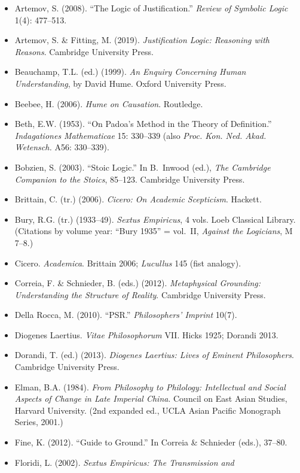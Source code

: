 \documentclass[11pt]{article}
\theoremstyle{plain}
\theoremstyle{definition}
\theoremstyle{remark}
\begin{document}
\begin{itemize}
\item Artemov, S. (2008). ``The Logic of Justification.'' \emph{Review
of Symbolic Logic} 1(4): 477--513.
\item Artemov, S. \& Fitting, M. (2019). \emph{Justification Logic:
Reasoning with Reasons}. Cambridge University Press.
\item Beauchamp, T.L. (ed.) (1999). \emph{An Enquiry Concerning Human
Understanding}, by David Hume. Oxford University Press.
\item Beebee, H. (2006). \emph{Hume on Causation}. Routledge.
\item Beth, E.W. (1953). ``On Padoa's Method in the Theory of
Definition.'' \emph{Indagationes Mathematicae} 15: 330--339
(also \emph{Proc. Kon. Ned. Akad. Wetensch.} A56: 330--339).
\item Bobzien, S. (2003). ``Stoic Logic.'' In B.~Inwood (ed.), \emph{The
Cambridge Companion to the Stoics}, 85--123. Cambridge University
Press.
\item Brittain, C. (tr.) (2006). \emph{Cicero: On Academic Scepticism}.
Hackett.
\item Bury, R.G. (tr.) (1933--49). \emph{Sextus Empiricus}, 4 vols.
Loeb Classical Library. (Citations by volume year: ``Bury 1935'' = vol.~II,
\emph{Against the Logicians}, M 7--8.)
\item Cicero. \emph{Academica}. Brittain 2006; \emph{Lucullus} 145
(fist analogy).
\item Correia, F. \& Schnieder, B. (eds.) (2012). \emph{Metaphysical
Grounding: Understanding the Structure of Reality}. Cambridge
University Press.
\item Della Rocca, M. (2010). ``PSR.'' \emph{Philosophers' Imprint}
10(7).
\item Diogenes Laertius. \emph{Vitae Philosophorum} VII. Hicks 1925;
Dorandi 2013.
\item Dorandi, T. (ed.) (2013). \emph{Diogenes Laertius: Lives of
Eminent Philosophers}. Cambridge University Press.
\item Elman, B.A. (1984). \emph{From Philosophy to Philology:
Intellectual and Social Aspects of Change in Late Imperial China}.
Council on East Asian Studies, Harvard University. (2nd expanded ed.,
UCLA Asian Pacific Monograph Series, 2001.)
\item Fine, K. (2012). ``Guide to Ground.'' In Correia \& Schnieder
(eds.), 37--80.
\item Floridi, L. (2002). \emph{Sextus Empiricus: The Transmission and
}
\end{itemize}
\end{document}
